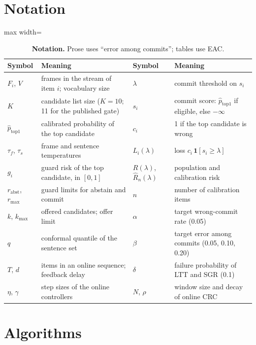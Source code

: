 \section{Notation}
\label{app:notation}

\begin{table}[H]
  \centering
  \caption{\textbf{Notation.} Prose uses ``error among commits''; tables use EAC.}
  \label{tab:notation}
  \small
  \begin{adjustbox}{max width=\linewidth}\begin{tabular}{@{}ll@{\qquad}ll@{}}
    \toprule
    \textbf{Symbol} & \textbf{Meaning} & \textbf{Symbol} & \textbf{Meaning} \\
    \midrule
    $F_i$, $V$ & frames in the stream of item $i$; vocabulary size & $\lambda$ & commit threshold on $s_i$ \\
    $K$ & candidate list size ($K = 10$; 11 for the published gate) & $s_i$ & commit score: $\hat p_{\mathrm{top1}}$ if eligible, else $-\infty$ \\
    $\hat p_{\mathrm{top1}}$ & calibrated probability of the top candidate & $c_i$ & 1 if the top candidate is wrong \\
    $\tau_f$, $\tau_s$ & frame and sentence temperatures & $L_i(\lambda)$ & loss $c_i\,\mathbf{1}[s_i \ge \lambda]$ \\
    $g_i$ & guard risk of the top candidate, in $[0,1]$ & $R(\lambda)$, $\hat R_n(\lambda)$ & population and calibration risk \\
    $r_{\mathrm{abst}}$, $r_{\mathrm{max}}$ & guard limits for abstain and commit & $n$ & number of calibration items \\
    $k$, $k_{\max}$ & offered candidates; offer limit & $\alpha$ & target wrong-commit rate (0.05) \\
    $q$ & conformal quantile of the sentence set & $\beta$ & target error among commits (0.05, 0.10, 0.20) \\
    $T$, $d$ & items in an online sequence; feedback delay & $\delta$ & failure probability of LTT and SGR (0.1) \\
    $\eta$, $\gamma$ & step sizes of the online controllers & $N$, $\rho$ & window size and decay of online CRC \\
    \bottomrule
  \end{tabular}\end{adjustbox}
\end{table}

\FloatBarrier
\section{Algorithms}
\label{app:algorithms}

